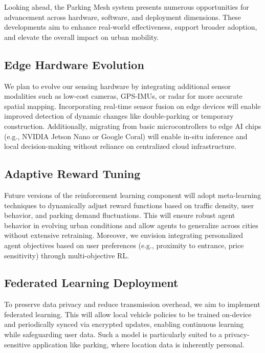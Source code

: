 

Looking ahead, the Parking Mesh system presents numerous opportunities for advancement across hardware, software, and deployment dimensions. These developments aim to enhance real-world effectiveness, support broader adoption, and elevate the overall impact on urban mobility.

\subsection{Edge Hardware Evolution}

We plan to evolve our sensing hardware by integrating additional sensor modalities such as low-cost cameras, GPS-IMUs, or radar for more accurate spatial mapping. Incorporating real-time sensor fusion on edge devices will enable improved detection of dynamic changes like double-parking or temporary construction. Additionally, migrating from basic microcontrollers to edge AI chips (e.g., NVIDIA Jetson Nano or Google Coral) will enable in-situ inference and local decision-making without reliance on centralized cloud infrastructure.

\subsection{Adaptive Reward Tuning}

Future versions of the reinforcement learning component will adopt meta-learning techniques to dynamically adjust reward functions based on traffic density, user behavior, and parking demand fluctuations. This will ensure robust agent behavior in evolving urban conditions and allow agents to generalize across cities without extensive retraining. Moreover, we envision integrating personalized agent objectives based on user preferences (e.g., proximity to entrance, price sensitivity) through multi-objective RL.

\subsection{Federated Learning Deployment}

To preserve data privacy and reduce transmission overhead, we aim to implement federated learning. This will allow local vehicle policies to be trained on-device and periodically synced via encrypted updates, enabling continuous learning while safeguarding user data. Such a model is particularly suited to a privacy-sensitive application like parking, where location data is inherently personal.

